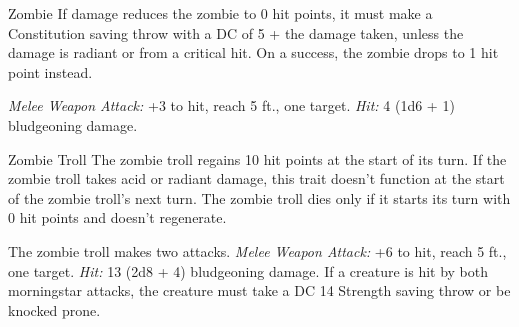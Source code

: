 \documentclass[10pt,a4paper,twoside,twocolumn,openany,bg=print,nodeprecatedcode]{dndbook}
\begin{document}
\begin{DndMonster}[float*=t]{Zombie}
\DndMonsterBasics[
armor-class = {8},
hit-points = {\DndDice{3d8 + 9}},
speed = {20 ft.}
]
\DndMonsterAbilityScores[
 str = 13,
 dex = 6,
 con = 16,
 int = 3,
 wis = 6,
 cha = 5
]
\DndMonsterDetails[
saving-throws = {Wis +0},
damage-immunities = {poison},
senses = {darkvision 60 ft., passive perception 8},
languages = {understands all languages it spoke in life but can't speak},
challenge = 1/4,
]
If damage reduces the zombie to 0 hit points, it must make a Constitution saving throw with a DC of 5 + the damage taken, unless the damage is radiant or from a critical hit. On a success, the zombie drops to 1 hit point instead.
\par
{}
\textsl{Melee Weapon Attack:} +3 to hit, reach 5 ft., one target. \textsl{Hit:} 4 (1d6 + 1) bludgeoning damage.
\end{DndMonster}


\clearpage

\begin{DndMonster}[float*=t]{Zombie Troll}
\DndMonsterBasics[
armor-class = {14 (natural armor)},
hit-points = {\DndDice{9d10 + 36}},
speed = {30 ft.}
]
\DndMonsterAbilityScores[
 str = 19,
 dex = 6,
 con = 18,
 int = 3,
 wis = 6,
 cha = 5
]
\DndMonsterDetails[
damage-resistances = {cold, necrotic},
damage-immunities = {poison},
senses = {darkvision 60 ft., passive perception 8},
languages = {understands Giant but can't speak},
challenge = 4,
]
The zombie troll regains 10 hit points at the start of its turn. If the zombie troll takes acid or radiant damage, this trait doesn't function at the start of the zombie troll's next turn. The zombie troll dies only if it starts its turn with 0 hit points and doesn't regenerate.
\par
{}
The zombie troll makes two attacks.
\textsl{Melee Weapon Attack:} +6 to hit, reach 5 ft., one target. \textsl{Hit:} 13 (2d8 + 4) bludgeoning damage.
If a creature is hit by both morningstar attacks, the creature must take a DC 14 Strength saving throw or be knocked prone.
\end{DndMonster}
\end{document}
